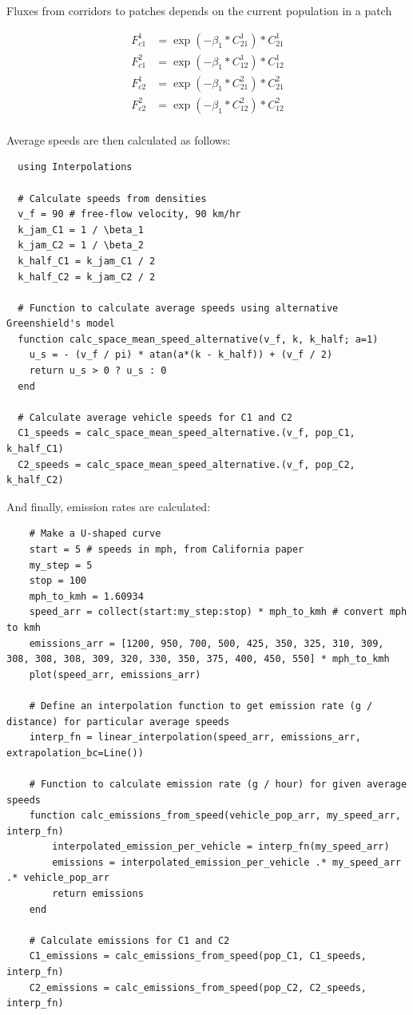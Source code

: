 \documentclass[
]{article}
\begin{document}
Fluxes from corridors to patches depends on the current population in a
patch


\begin{align*}
    F_{c1}^{1} &= \exp{(-\beta_1 * C^1_{21})} * C^1_{21} \\
    F_{c1}^{2} &= \exp{(-\beta_1 * C^1_{12})} * C^1_{12} \\
    F_{c2}^{1} &= \exp{(-\beta_1 * C^2_{21})} * C^2_{21} \\
    F_{c2}^{2} &= \exp{(-\beta_1 * C^2_{12})} * C^2_{12} \\
\end{align*}


Average speeds are then calculated as follows:

\begin{verbatim}
  using Interpolations

  # Calculate speeds from densities
  v_f = 90 # free-flow velocity, 90 km/hr
  k_jam_C1 = 1 / \beta_1
  k_jam_C2 = 1 / \beta_2
  k_half_C1 = k_jam_C1 / 2
  k_half_C2 = k_jam_C2 / 2

  # Function to calculate average speeds using alternative Greenshield's model
  function calc_space_mean_speed_alternative(v_f, k, k_half; a=1)
    u_s = - (v_f / pi) * atan(a*(k - k_half)) + (v_f / 2)
    return u_s > 0 ? u_s : 0
  end

  # Calculate average vehicle speeds for C1 and C2
  C1_speeds = calc_space_mean_speed_alternative.(v_f, pop_C1, k_half_C1)
  C2_speeds = calc_space_mean_speed_alternative.(v_f, pop_C2, k_half_C2)
\end{verbatim}

And finally, emission rates are calculated:

\begin{verbatim}
    # Make a U-shaped curve
    start = 5 # speeds in mph, from California paper
    my_step = 5
    stop = 100
    mph_to_kmh = 1.60934
    speed_arr = collect(start:my_step:stop) * mph_to_kmh # convert mph to kmh
    emissions_arr = [1200, 950, 700, 500, 425, 350, 325, 310, 309, 308, 308, 308, 309, 320, 330, 350, 375, 400, 450, 550] * mph_to_kmh
    plot(speed_arr, emissions_arr)
    
    # Define an interpolation function to get emission rate (g / distance) for particular average speeds
    interp_fn = linear_interpolation(speed_arr, emissions_arr, extrapolation_bc=Line())

    # Function to calculate emission rate (g / hour) for given average speeds
    function calc_emissions_from_speed(vehicle_pop_arr, my_speed_arr, interp_fn)
        interpolated_emission_per_vehicle = interp_fn(my_speed_arr)
        emissions = interpolated_emission_per_vehicle .* my_speed_arr .* vehicle_pop_arr
        return emissions
    end

    # Calculate emissions for C1 and C2
    C1_emissions = calc_emissions_from_speed(pop_C1, C1_speeds, interp_fn)
    C2_emissions = calc_emissions_from_speed(pop_C2, C2_speeds, interp_fn)
\end{verbatim}
\end{document}
